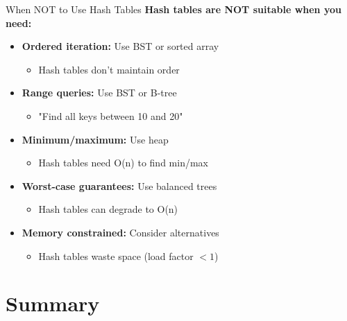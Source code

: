\documentclass[aspectratio=169]{beamer}
\begin{document}
\begin{frame}{When NOT to Use Hash Tables}
  \textbf{Hash tables are NOT suitable when you need:}

  \vspace{0.3cm}
  \begin{itemize}
    \item \textbf{Ordered iteration:} Use BST or sorted array
      \begin{itemize}
        \item Hash tables don't maintain order
      \end{itemize}

    \vspace{0.2cm}
    \item \textbf{Range queries:} Use BST or B-tree
      \begin{itemize}
        \item "Find all keys between 10 and 20"
      \end{itemize}

    \vspace{0.2cm}
    \item \textbf{Minimum/maximum:} Use heap
      \begin{itemize}
        \item Hash tables need O(n) to find min/max
      \end{itemize}

    \vspace{0.2cm}
    \item \textbf{Worst-case guarantees:} Use balanced trees
      \begin{itemize}
        \item Hash tables can degrade to O(n)
      \end{itemize}

    \vspace{0.2cm}
    \item \textbf{Memory constrained:} Consider alternatives
      \begin{itemize}
        \item Hash tables waste space (load factor $< 1$)
      \end{itemize}
  \end{itemize}
\end{frame}

\section{Summary}
\end{document}
